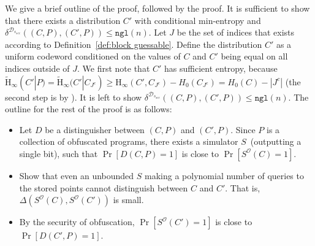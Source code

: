 \documentclass[11pt]{article}
\newcommand{\defref}[1]{\mbox{Definition~\ref{#1}}}
\newcommand{\ngl}{\ensuremath{\mathtt{ngl}}\xspace}
\newcommand{\Hoo}{\mathrm{H}_\infty}
\newcommand{\Hav}{\tilde{\mathrm{H}}_\infty}
\begin{document}
We give a brief outline of the proof, followed by the proof.
It is sufficient to show that there exists a distribution $C'$ with conditional min-entropy and $\delta^{\mathcal{D}_{s_{sec}}}((C, P), (C', P))\le \ngl(n)$.  Let $J$ be the set of indices that exists according to \defref{def:block guessable}. Define the distribution $C'$ as a uniform codeword conditioned on the values of $C$ and $C'$ being equal on all indices outside of $J$.  We first note that $C'$ has sufficient entropy, because $\Hav(C' |P) = \Hav(C' | C_{J^c}) \ge \Hoo(C', C_{J^c}) - H_0(C_{J^c})  = H_0(C) - |J^c|$ (the second step is by \cite[Lemma 2.2b]{DBLP:journals/siamcomp/DodisORS08}).  It is left to show $\delta^{\mathcal{D}_{s_{sec}}}((C, P), (C', P)) \le \ngl(n)$.
The outline for the rest of the proof is as follows:
\begin{itemize}
\item Let $D$ be a distinguisher between $(C, P)$ and $(C', P)$. Since $P$ is a collection of obfuscated programs, there exists a simulator $S$~(outputting a single bit), such that $\Pr[D(C, P)=1]$ is close to $\Pr[S^{\mathcal{O}}(C)=1]$.
\item Show that even an unbounded $S$ making a polynomial number of queries to the stored points cannot distinguish between $C$ and $C'$.  That is, $\Delta(S^{\mathcal{O}}(C),S^{\mathcal{O}}(C'))$ is small.
\item By the security of obfuscation, $\Pr[S^{\mathcal{O}}(C')=1]$ is close to $\Pr[D(C', P)=1]$.
\end{itemize}
\end{document}
